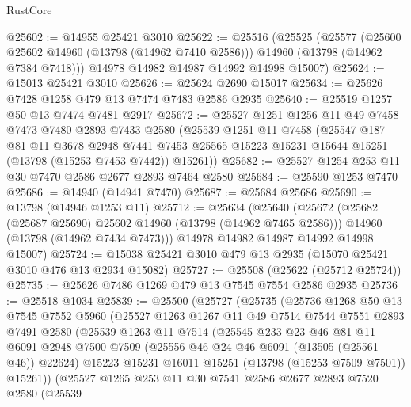 \begin{lexlean}{RustCore}
\begin{coremodule}
@25602 := @14955 @25421 @3010
@25622 := @25516
    (@25525
      (@25577
        (@25600 @25602 @14960 (@13798 (@14962 @7410 @2586)))
        @14960
        (@13798 (@14962 @7384 @7418)))
      @14978
      @14982
      @14987
      @14992
      @14998
      @15007)
@25624 := @15013 @25421 @3010
@25626 := @25624 @2690 @15017
@25634 := @25626 @7428 @1258 @479 @13 @7474 @7483 @2586 @2935
@25640 := @25519 @1257 @50 @13 @7474 @7481 @2917
@25672 := @25527
    @1251
    @1256
    @11
    @49
    @7458
    @7473
    @7480
    @2893
    @7433
    @2580
    (@25539
      @1251
      @11
      @7458
      (@25547
        @187
        @81
        @11
        @3678
        @2948
        @7441
        @7453
        @25565
        @15223
        @15231
        @15644
        @15251
        (@13798 (@15253 @7453 @7442))
        @15261))
@25682 := @25527 @1254 @253 @11 @30 @7470 @2586 @2677 @2893 @7464 @2580
@25684 := @25590 @1253 @7470
@25686 := @14940 (@14941 @7470)
@25687 := @25684 @25686
@25690 := @13798 (@14946 @1253 @11)
@25712 := @25634
    (@25640
      (@25672
        (@25682 (@25687 @25690) @25602 @14960 (@13798 (@14962 @7465 @2586)))
        @14960
        (@13798 (@14962 @7434 @7473)))
      @14978
      @14982
      @14987
      @14992
      @14998
      @15007)
@25724 := @15038 @25421 @3010 @479 @13 @2935 (@15070 @25421 @3010 @476 @13 @2934 @15082)
@25727 := @25508 (@25622 (@25712 @25724))
@25735 := @25626 @7486 @1269 @479 @13 @7545 @7554 @2586 @2935
@25736 := @25518 @1034
@25839 := @25500
    (@25727
      (@25735
        (@25736
          @1268
          @50
          @13
          @7545
          @7552
          @5960
          (@25527
            @1263
            @1267
            @11
            @49
            @7514
            @7544
            @7551
            @2893
            @7491
            @2580
            (@25539
              @1263
              @11
              @7514
              (@25545
                @233
                @23
                @46
                @81
                @11
                @6091
                @2948
                @7500
                @7509
                (@25556 @46 @24 @46 @6091 (@13505 (@25561 @46)) @22624)
                @15223
                @15231
                @16011
                @15251
                (@13798 (@15253 @7509 @7501))
                @15261))
            (@25527
              @1265
              @253
              @11
              @30
              @7541
              @2586
              @2677
              @2893
              @7520
              @2580
              (@25539

\end{coremodule}
\end{lexlean}
